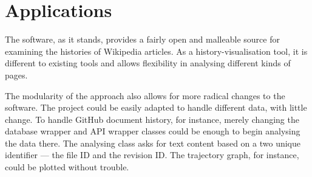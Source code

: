 \section{Applications}
The software, as it stands, provides a fairly open and malleable
source for examining the histories of Wikipedia articles. As a
history-visualisation tool, it is different to existing tools and
allows flexibility in analysing different kinds of pages.

The modularity of the approach also allows for more radical changes to
the software. The project could be easily adapted to handle different
data, with little change. To handle GitHub document history, for
instance, merely changing the database wrapper and API wrapper classes
could be enough to begin analysing the data there. The analysing class
asks for text content based on a two unique identifier --- the file ID
and the revision ID. The trajectory graph, for instance, could be
plotted without trouble.
